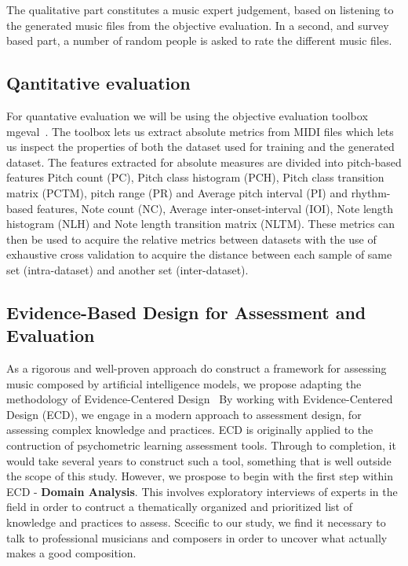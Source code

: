 \documentclass{IEEEtran}
\begin{document}
        The qualitative part constitutes a music expert judgement,
        based on listening to the generated music files from the objective evaluation.
        In a second, and survey based part, a number of random people is asked
        to rate the different music files.
        
        \subsection{Qantitative evaluation}
        
        For quantative evaluation we will be using the objective
        evaluation toolbox mgeval~\cite{yang2020evaluation}.
        The toolbox lets us extract absolute metrics from MIDI files
        which lets us inspect the properties of both the dataset used
        for training and the generated dataset. The features extracted
        for absolute measures are divided into pitch-based features Pitch count (PC),
        Pitch class histogram (PCH), Pitch class transition matrix (PCTM),
        pitch range (PR) and Average pitch interval (PI) and rhythm-based features,
        Note count (NC), Average inter-onset-interval (IOI), Note length
        histogram (NLH) and Note length transition matrix (NLTM).
        These metrics can then be used to acquire the relative metrics between
        datasets with the use of exhaustive cross validation to acquire the
        distance between each sample of same set (intra-dataset) and another
        set (inter-dataset). 
        
        \subsection{Evidence-Based Design for Assessment and Evaluation}
        As a rigorous and well-proven approach do construct a framework for 
        assessing music composed by artificial intelligence models, we propose 
        adapting the methodology of Evidence-Centered
        Design~\cite{mislevy2003focus,mislevy2017evidence}
        By working with Evidence-Centered Design (ECD), we engage in a modern
        approach to assessment design,
        for assessing complex knowledge and practices.
        ECD is originally applied to the contruction of psychometric learning
        assessment tools. Through to completion, it would take several years to 
        construct such a tool, something that is well outside the scope of this 
        study. However, we prospose to begin with the first step within ECD - 
        \textbf{Domain Analysis}. This involves exploratory interviews of experts
        in the field in order to contruct a thematically organized and prioritized
        list of knowledge and practices to assess. Scecific to our study,
        we find it necessary to talk to professional musicians and composers 
        in order to uncover what actually makes a good composition.
        
\end{document}
